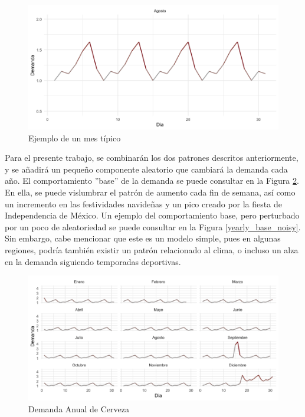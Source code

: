 \begin{figure}[ht!]
\caption{Ejemplo de un mes t\'ipico}
\label{weekly_base}
\includegraphics[width=12cm]{tesis_tex/figs/monthly_customer_demand_ggplot.png}
\centering
\end{figure}

Para el presente trabajo, se combinar\'an los dos patrones descritos anteriormente, y se a\~nadir\'a un peque\~no componente aleatorio que cambiar\'a la demanda cada a\~no. El comportamiento ''base'' de la demanda se puede consultar en la Figura \ref{yearly_base}. En ella, se puede vislumbrar el patr\'on de aumento cada fin de semana, as\'i como un incremento en las festividades navide\~nas y un pico creado por la fiesta de Independencia de M\'exico. Un ejemplo del comportamiento base, pero perturbado por un poco de aleatoriedad se puede consultar en la Figura \ref{yearly_base_noisy}. Sin embargo, cabe mencionar que este es un modelo simple, pues en algunas regiones, podr\'ia tambi\'en existir un patr\'on relacionado al clima, o incluso un alza en la demanda siguiendo temporadas deportivas. \\

\begin{figure}[ht!]
\caption{Demanda Anual de Cerveza}
\label{yearly_base}
\includegraphics[width=13cm]{tesis_tex/figs/monthly_demand_ggplot.png}
\centering
\end{figure}

